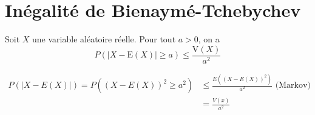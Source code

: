 \documentclass[../main.tex]{subfiles}
\begin{document}
\section{Inégalité de Bienaymé-Tchebychev}
\begin{tcolorbox}[title=Théorème 33.19, title filled=false, colframe=orange, colback=orange!10!white]
    Soit $X$ une variable aléatoire réelle. Pour tout $a>0$, on a
    $$P(|X-\mathrm{E}(X)| \geq a) \leq \frac{\mathrm{V}(X)}{a^2}$$
\end{tcolorbox}

\begin{align*}
    P(|X - E(X)|) = P((X - E(X))^2 \geq a^2) &\leq \frac{E((X-E(X))^2)}{a^2} \text{ (Markov)} \\
    &= \frac{V(x)}{a^2}
\end{align*}
\end{document}
